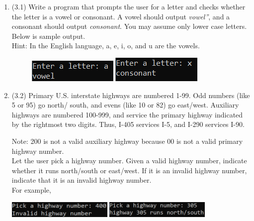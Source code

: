 \documentclass{article}
\newcommand{\csq}[1]{\reflectbox{''}#1''}  %
\begin{document}
\begin{enumerate}
\item (3.1)  
		Write a program that prompts the user for a letter and checks whether the letter is a vowel 
		or consonant.  A vowel should output \textit{\csq{vowel}}, and a consonant should output 
		\textit{consonant}.  You may assume only lower case letters. Below is sample output.\\
		Hint: In the English language, a, e, i, o, and u are the vowels.
	
		\begin{figure}[h]
		\centering
			\begin{minipage}{.5\textwidth}
			\centering
				\includegraphics[scale=1.2]{./imgs/vowelYesAlt.png}
			\end{minipage}%
			\begin{minipage}{.5\textwidth}
			\centering
				\includegraphics[scale=1.1]{./imgs/vowelNoAlt.png}
			\end{minipage}
		\end{figure}





\item (3.2)  
		Primary U.S. interstate highways are numbered 1-99.  Odd numbers (like 5 or 95) go north/
		south, and evens (like 10 or 82) go east/west.  Auxiliary highways are numbered 100-999, and 
		service the primary highway indicated by the rightmost two digits.  Thus, I-405 services 
		I-5, and I-290 services I-90.
		
		Note: 200 is not a valid auxiliary highway because 00 is not a valid primary highway 
		number.\\
		
		Let the user pick a highway number.  Given a valid highway number, indicate whether it runs 
		north/south or east/west.  If it is an invalid highway number, indicate that it is an 
		invalid highway number. \\
		For example,
		
		\hfill
		\includegraphics[width = 2in]{./imgs/highwayValidator1.PNG} \hfill
		\includegraphics[width = 2in]{./imgs/highwayValidator2.PNG} \hfill \ 


\end{enumerate}
\end{document}
